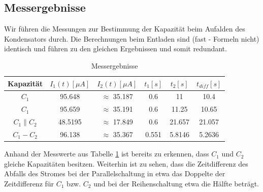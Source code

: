 \documentclass[10pt,a4paper]{article}
\begin{document}
\subsection{Messergebnisse}
\begin{flushleft}

Wir führen die Messungen zur Bestimmung der Kapazität beim Aufalden des Kondensators durch. Die Berechnungen beim Entladen sind (fast - Formeln nicht) identisch und führen zu den gleichen Ergebnissen und somit redundant.

\newpage

\begin{table}[h]
\centering
\caption{Messergebnisse}
\label{tab:messerg}
\begin{tabular}{|c|c|c|c|c|c|}
\hline
Kapazität & $I_1(t) [\mu A]$ & $I_2(t) [\mu A]$ & $ t_1 [s]$ & $t_2 [s]$ & $t_{diff} [s]$ \\
\hline
$C_1$ & 95.648 & $\approx$ 35.187 & 0.6 & 11 & 10.4  \\
\hline
$C_1$ & 95.659 & $\approx$ 35.191 & 0.6 & 11.25 & 10.65 \\
\hline
$C_1 \parallel C_2$ & 48.5195 & $\approx$ 17.849 & 0.6 & 21.657 & 21.057 \\
\hline
$C_1 - C_2$ & 96.138 & $\approx$ 35.367 & 0.551 & 5.8146 & 5.2636 \\
\hline
\end{tabular}
\end{table}

Anhand der Messwerte aus Tabelle \ref{tab:messerg} ist bereits zu erkennen, dass $C_1$ und $C_2$ gleiche Kapazitäten besitzen. Weiterhin ist zu sehen, dass die Zeitdifferenz des Abfalls des Stromes bei der Parallelschaltung in etwa das Doppelte der Zeitdifferenz für $C_1$ bzw. $C_2$ und bei der Reihenschaltung etwa die Hälfte beträgt.
\end{flushleft}
\end{document}
